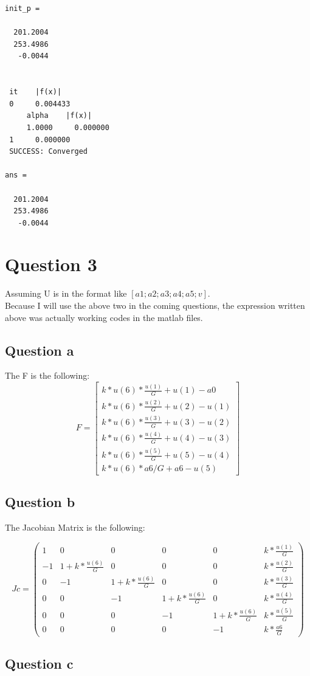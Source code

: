 \documentclass[11pt]{article}
\begin{document}
\begin{verbatim}
init_p =

  201.2004
  253.4986
   -0.0044


 it    |f(x)|
 0     0.004433
     alpha    |f(x)|
     1.0000     0.000000
 1     0.000000
 SUCCESS: Converged

ans =

  201.2004
  253.4986
   -0.0044
\end{verbatim}

\section{Question 3}
Assuming U is in the format like ${[a1;a2;a3;a4;a5;v]}$.\\


Because I will use the above two in the coming questions, the expression written above was
actually working codes in the matlab files.
\subsection{Question a}
The F is the following:
\[
F=
\begin{bmatrix}
k*u(6)*\frac{u(1)}{G} + u(1) - a0\\
k*u(6)*\frac{u(2)}{G} + u(2) - u(1)\\
k*u(6)*\frac{u(3)}{G} + u(3) - u(2)\\
k*u(6)*\frac{u(4)}{G} + u(4) - u(3)\\
k*u(6)*\frac{u(5)}{G} + u(5) - u(4)\\
k*u(6)*a6/G + a6 - u(5)
\end{bmatrix}
\]

\subsection{Question b}
The Jacobian Matrix is the following:

\[
Jc
=
\begin{pmatrix}
1&0&0&0&0&k*\frac{u(1)}{G}\\
-1&1+k*\frac{u(6)}{G}&0&0&0&k*\frac{u(2)}{G}\\
0&-1&1+k*\frac{u(6)}{G}&0&0&k*\frac{u(3)}{G}\\
0&0&-1&1+k*\frac{u(6)}{G}&0&k*\frac{u(4)}{G}\\
0&0&0&-1&1+k*\frac{u(6)}{G}&k*\frac{u(5)}{G}\\
0&0&0&0&-1&k*\frac{a6}{G}
\end{pmatrix}
\]
\subsection{Question c}
\end{document}
